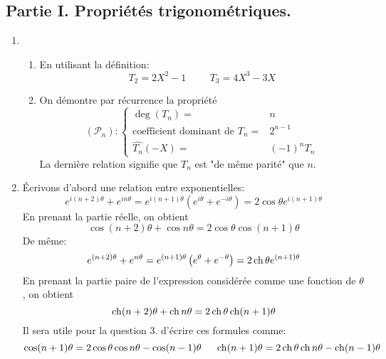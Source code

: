 \subsection*{Partie I. Propriétés trigonométriques.}
\begin{enumerate}
 \item \begin{enumerate}
 \item En utilisant la définition:
\begin{displaymath}
 T_2 = 2X^2 -1  \hspace{1cm} T_3 = 4X^3 -3X 
\end{displaymath}
 \item On démontre par récurrence la propriété
\begin{displaymath}
 (\mathcal P_n) : \left\lbrace
\begin{aligned}
 \deg(T_n) =& n \\
 \text{coefficient dominant de } T_n =& 2^{n-1}\\
 \widehat{T_n}(-X) =& (-1)^n T_n
\end{aligned}
 \right. 
\end{displaymath}
La dernière relation signifie que $T_n$ est "de même parité" que $n$.
\end{enumerate}
\item \'Ecrivons d'abord une relation entre exponentielles:
\begin{displaymath}
 e^{i(n+2)\theta}+e^{in\theta} = e^{i(n+1)\theta}\left( e^{i\theta}+e^{-i\theta}\right)=2\cos \theta e^{i(n+1)\theta} 
\end{displaymath}
En prenant la partie réelle, on obtient
\begin{displaymath}
 \cos(n+2)\theta + \cos n\theta = 2\cos\theta \cos (n+1)\theta
\end{displaymath}
De même:
\begin{displaymath}
 e^{(n+2)\theta}+e^{n\theta} = e^{(n+1)\theta}\left( e^{\theta}+e^{-\theta}\right)=2\operatorname{ch} \theta e^{(n+1)\theta} 
\end{displaymath}
En prenant la partie paire de l'expression considérée comme une fonction de $\theta$, on obtient
\begin{displaymath}
 \operatorname{ch}(n+2)\theta + \operatorname{ch} n\theta = 2\operatorname{ch}\theta \operatorname{ch} (n+1)\theta
\end{displaymath}
Il sera utile pour la question 3. d'écrire ces formules comme:
\begin{displaymath}
 \cos(n+1)\theta = 2\cos\theta \cos n\theta -\cos(n-1)\theta \hspace{0.5cm}
\operatorname{ch}(n+1)\theta = 2\operatorname{ch}\theta \operatorname{ch} n\theta -\operatorname{ch}(n-1)\theta
\end{displaymath}


\end{enumerate}
